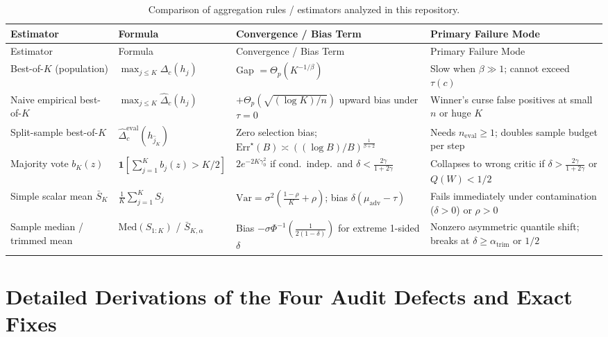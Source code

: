 \documentclass[11pt]{article}
\newcommand{\ind}{\mathbf{1}}
\begin{document}
{\small
\renewcommand{\arraystretch}{1.18}
\setlength{\tabcolsep}{4pt}
\begin{longtable}{@{}>{\raggedright\arraybackslash}p{3.0cm}>{\raggedright\arraybackslash}p{3.4cm}>{\raggedright\arraybackslash}p{4.0cm}>{\raggedright\arraybackslash}p{4.0cm}@{}}
\caption{Comparison of aggregation rules / estimators analyzed in this repository.}
\label{tab:per_term}\\
\toprule
Estimator & Formula & Convergence / Bias Term & Primary Failure Mode \\
\midrule
\endfirsthead
\toprule
Estimator & Formula & Convergence / Bias Term & Primary Failure Mode \\
\midrule
\endhead
Best-of-$K$ (population) & $\max_{j \le K} \Delta_c(h_j)$ & Gap $= \Theta_p(K^{-1/\beta})$ & Slow when $\beta \gg 1$; cannot exceed $\tau(c)$ \\
\midrule
Naive empirical best-of-$K$ & $\max_{j \le K} \widehat{\Delta}_c(h_j)$ & $+\Theta_p(\sqrt{(\log K)/n})$ upward bias under $\tau=0$ & Winner's curse false positives at small $n$ or huge $K$ \\
\midrule
Split-sample best-of-$K$ & $\widehat{\Delta}^{\mathrm{eval}}_c(h_{\hat{j}_K})$ & Zero selection bias; $\mathrm{Err}^\star(B) \asymp ((\log B)/B)^{\frac{1}{\beta+2}}$ & Needs $n_{\mathrm{eval}} \ge 1$; doubles sample budget per step \\
\midrule
Majority vote $b_K(z)$ & $\ind[\sum_{j=1}^K b_j(z) > K/2]$ & $2e^{-2K\gamma_0^2}$ if cond.\ indep.\ and $\delta < \frac{2\gamma}{1+2\gamma}$ & Collapses to wrong critic if $\delta > \frac{2\gamma}{1+2\gamma}$ or $Q(W) < 1/2$ \\
\midrule
Simple scalar mean $\bar{S}_K$ & $\frac{1}{K}\sum_{j=1}^K S_j$ & $\mathrm{Var} = \sigma^2(\frac{1-\rho}{K} + \rho)$; bias $\delta(\mu_{\mathrm{adv}} - \tau)$ & Fails immediately under contamination ($\delta>0$) or $\rho > 0$ \\
\midrule
Sample median / trimmed mean & $\mathrm{Med}(S_{1:K})$ / $\bar{S}_{K,\alpha}$ & Bias $-\sigma\Phi^{-1}(\frac{1}{2(1-\delta)})$ for extreme 1-sided $\delta$ & Nonzero asymmetric quantile shift; breaks at $\delta \ge \alpha_{\mathrm{trim}}$ or $1/2$ \\
\bottomrule
\end{longtable}
}

\section{Detailed Derivations of the Four Audit Defects and Exact Fixes}
\label{sec:bug_derivations}
\end{document}
